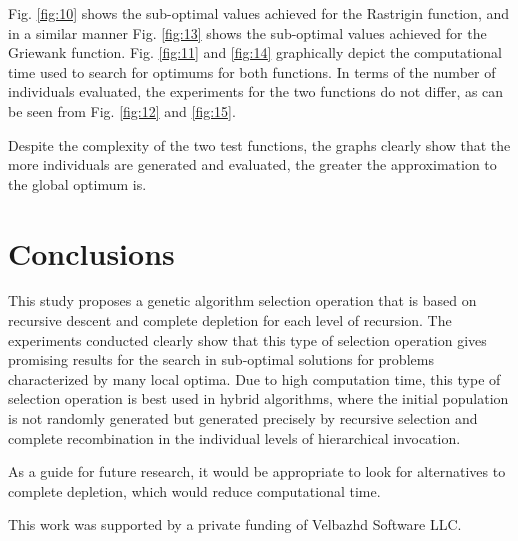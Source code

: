 \documentclass[graybox]{styles/svmult}
\begin{document}
Fig. \ref{fig:10} shows the sub-optimal values achieved for the Rastrigin function, and in a similar manner Fig. \ref{fig:13} shows the sub-optimal values achieved for the Griewank function. Fig. \ref{fig:11} and \ref{fig:14} graphically depict the computational time used to search for optimums for both functions. In terms of the number of individuals evaluated, the experiments for the two functions do not differ, as can be seen from Fig. \ref{fig:12} and \ref{fig:15}.

Despite the complexity of the two test functions, the graphs clearly show that the more individuals are generated and evaluated, the greater the approximation to the global optimum is.

\section{Conclusions}
\label{sec:4}

This study proposes a genetic algorithm selection operation that is based on recursive descent and complete depletion for each level of recursion. The experiments conducted clearly show that this type of selection operation gives promising results for the search in sub-optimal solutions for problems characterized by many local optima. Due to high computation time, this type of selection operation is best used in hybrid algorithms, where the initial population is not randomly generated but generated precisely by recursive selection and complete recombination in the individual levels of hierarchical invocation.

As a guide for future research, it would be appropriate to look for alternatives to complete depletion, which would reduce computational time.

\begin{acknowledgement}
This work was supported by a private funding of Velbazhd Software LLC. 
\end{acknowledgement}


\end{document}
